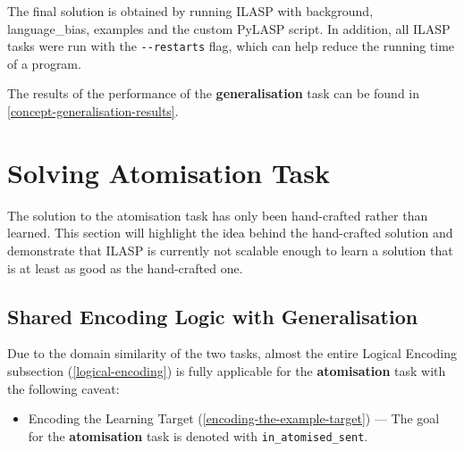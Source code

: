 The final solution is obtained by running ILASP with background, language\_bias, examples and the custom PyLASP script.
In addition, all ILASP tasks were run with the \verb+--restarts+ flag, which can help reduce the running time of a program.

The results of the performance of the \textbf{generalisation} task can be found in \ref{concept-generalisation-results}.



\section{Solving Atomisation Task}
\label{solving-atomisation-task}

The solution to the atomisation task has only been hand-crafted rather than learned.
This section will highlight the idea behind the hand-crafted solution and demonstrate that ILASP is currently not scalable enough to learn a solution that is at least as good as the hand-crafted one.

\subsection{Shared Encoding Logic with Generalisation}

Due to the domain similarity of the two tasks, almost the entire Logical Encoding subsection (\ref{logical-encoding}) is fully applicable for the \textbf{atomisation} task with the following caveat:
\begin{itemize}
    \item Encoding the Learning Target (\ref{encoding-the-example-target}) --- The goal for the \textbf{atomisation} task is denoted with \verb+in_atomised_sent+.
\end{itemize}

